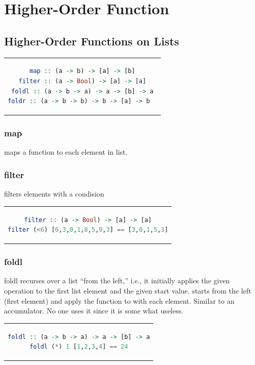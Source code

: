 \newpage
\section{Higher-Order Function}
\subsection{Higher-Order Functions on Lists}
\begin{center}
\begin{tabular}{c}
\begin{lstlisting}[language=Haskell]
map :: (a -> b) -> [a] -> [b]
filter :: (a -> Bool) -> [a] -> [a]
foldl :: (a -> b -> a) -> a -> [b] -> a
foldr :: (a -> b -> b) -> b -> [a] -> b  
\end{lstlisting}
\end{tabular}
\end{center}

\subsubsection{map}
maps a function to each element in list.

\subsubsection{filter}
filters elements with a condision

\begin{center}
\begin{tabular}{c}
\begin{lstlisting}[language=Haskell]
filter :: (a -> Bool) -> [a] -> [a]
filter (<6) [6,3,0,1,8,5,9,3] == [3,0,1,5,3]
\end{lstlisting}
\end{tabular}
\end{center}

\subsubsection{foldl}
foldl recurses over a list “from the left,” i.e., it initially applies the
given operation to the first list element and the given start value.
starts from the left (first element) and apply the function to with each element.
Similar to an accumulator. No one uses it since it is some what useless.

\begin{center}
\begin{tabular}{c}
\begin{lstlisting}[language=Haskell]
foldl :: (a -> b -> a) -> a -> [b] -> a
foldl (*) 1 [1,2,3,4] == 24
\end{lstlisting}
\end{tabular}
\end{center}


